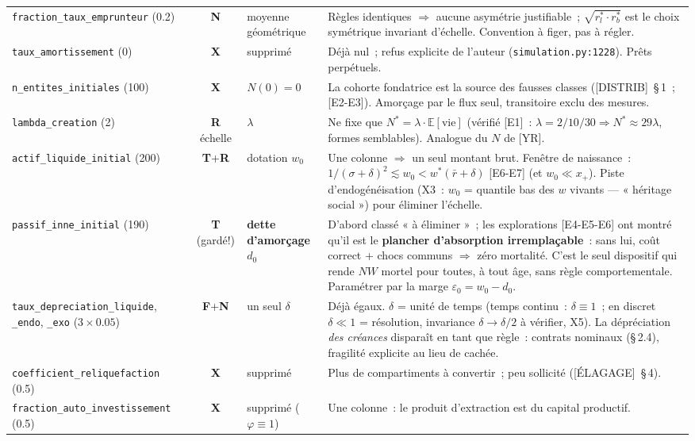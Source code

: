 \documentclass[11pt,a4paper]{article}
\newcommand{\NW}{\mathit{NW}}
\begin{document}
\begin{xltabular}{\linewidth}{@{}>{\raggedright\arraybackslash}p{3.1cm}c>{\raggedright\arraybackslash}p{2.7cm}X@{}}
\texttt{fraction_taux_emprunteur} (0.2) & \textbf{N} & moyenne géométrique & Règles identiques $\Rightarrow$ aucune asymétrie justifiable~; $\sqrt{r^*_l\cdot r^*_b}$ est le choix symétrique invariant d'échelle. Convention à figer, pas à régler. \\
\texttt{taux_amortissement} (0) & \textbf{X} & supprimé & Déjà nul~; refus explicite de l'auteur (\texttt{simulation.py:1228}). Prêts perpétuels. \\
\texttt{n_entites_initiales} (100) & \textbf{X} & $N(0)=0$ & La cohorte fondatrice est la source des fausses classes ([DISTRIB]~\S\,1~; [E2-E3]). Amorçage par le flux seul, transitoire exclu des mesures. \\
\texttt{lambda_creation} (2) & \textbf{R} échelle & $\lambda$ & Ne fixe que $N^*=\lambda\cdot\mathbb E[\text{vie}]$ (vérifié [E1]~: $\lambda=2/10/30 \Rightarrow N^*\approx 29\lambda$, formes semblables). Analogue du $N$ de [YR]. \\
\texttt{actif_liquide_initial} (200) & \textbf{T}+\textbf{R} & dotation $w_0$ & Une colonne $\Rightarrow$ un seul montant brut. Fenêtre de naissance~: $1/(\sigma+\delta)^2 \lesssim w_0 < w^*(\bar r+\delta)$ [E6-E7] (et $w_0 \ll x_+$). Piste d'endogénéisation (X3~: $w_0$ = quantile bas des $w$ vivants --- « héritage social ») pour éliminer l'échelle. \\
\texttt{passif_inne_initial} (190) & \textbf{T} (gardé!) & \textbf{dette d'amorçage $d_0$} & D'abord classé « à éliminer »~; les explorations [E4-E5-E6] ont montré qu'il est le \textbf{plancher d'absorption irremplaçable}~: sans lui, coût correct + chocs communs $\Rightarrow$ zéro mortalité. C'est le seul dispositif qui rende $\NW$ mortel pour toutes, à tout âge, sans règle comportementale. Paramétrer par la marge $\varepsilon_0=w_0-d_0$. \\
\texttt{taux_depreciation_liquide}, \texttt{_endo}, \texttt{_exo} ($3\times 0.05$) & \textbf{F}+\textbf{N} & un seul $\delta$ & Déjà égaux. $\delta$ = unité de temps (temps continu~: $\delta\equiv 1$~; en discret $\delta\ll 1$ = résolution, invariance $\delta\to\delta/2$ à vérifier, X5). La dépréciation \emph{des créances} disparaît en tant que règle~: contrats nominaux (\S\,2.4), fragilité explicite au lieu de cachée. \\
\texttt{coefficient_reliquefaction} (0.5) & \textbf{X} & supprimé & Plus de compartiments à convertir~; peu sollicité ([ÉLAGAGE]~\S\,4). \\
\texttt{fraction_auto_investissement} (0.5) & \textbf{X} & supprimé ($\varphi\equiv 1$) & Une colonne~: le produit d'extraction est du capital productif. \\

\end{xltabular}
\end{document}
